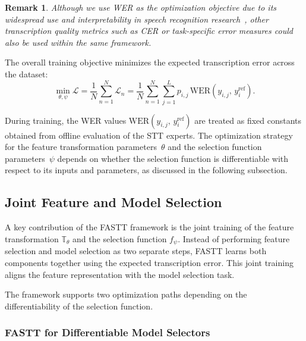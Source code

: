 \documentclass[journal]{IEEEtran}
\newtheorem{remark}{Remark}
\begin{document}
    \begin{remark}
        Although we use WER as the optimization objective due to its widespread use
        and interpretability in speech recognition research~\cite{yu2016asrdeep,li2014overviewrobust},
        other transcription quality metrics such as CER or task-specific error
        measures could also be used within the same framework.
    \end{remark}

    The overall training objective minimizes the expected transcription error
    across the dataset:
    \begin{equation}
        \min_{\theta,\psi}\mathcal{L}= \frac{1}{N}\sum_{n=1}^{N}\mathcal{L}_{n}=
        \frac{1}{N}\sum_{n=1}^{N}\sum_{j=1}^{L}p_{i,j}\,\mathrm{WER}(y_{i,j},\,y_i^{\mathrm{ref}}
        ). \label{eq:training_objective}
    \end{equation}

    During training, the WER values $\mathrm{WER}(y_{i,j},\,y_i^{\mathrm{ref}})$ are treated as
    fixed constants obtained from offline evaluation of the STT experts. The
    optimization strategy for the feature transformation parameters~$\theta$ and
    the selection function parameters~$\psi$ depends on whether the selection
    function is differentiable with respect to its inputs and parameters, as discussed
    in the following subsection.

    \subsection{Joint Feature and Model Selection}
    \label{subsec:selection_network}

    A key contribution of the FASTT framework is the joint
    training of the feature transformation $\mathbb{T}_{\theta}$ and the selection
    function $f_{\psi}$. Instead of performing feature selection and model
    selection as two separate steps, FASTT learns both components together
    using the expected transcription error. This joint training aligns
    the feature representation with the model selection task. 
    
    The framework supports two optimization paths depending on the differentiability
    of the selection function.

    \subsubsection{FASTT for Differentiable Model Selectors}
    \label{subsubsec:diff_selectors}
\end{document}
